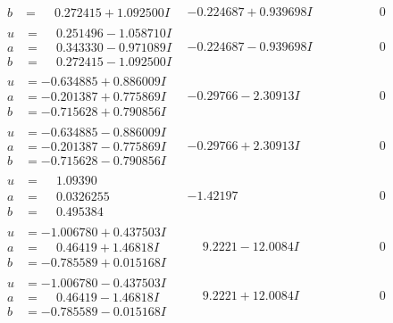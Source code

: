 \documentclass[1p]{elsarticle_modified}
\theoremstyle{definition}
\begin{document}
$$\begin{array}{c|c|c}
\begin{aligned}
b &= \phantom{-}0.272415 + 1.092500 I\end{aligned}
 & -0.224687 + 0.939698 I & \phantom{-0.000000 } 0 \\ \hline\begin{aligned}
u &= \phantom{-}0.251496 - 1.058710 I \\
a &= \phantom{-}0.343330 - 0.971089 I \\
b &= \phantom{-}0.272415 - 1.092500 I\end{aligned}
 & -0.224687 - 0.939698 I & \phantom{-0.000000 } 0 \\ \hline\begin{aligned}
u &= -0.634885 + 0.886009 I \\
a &= -0.201387 + 0.775869 I \\
b &= -0.715628 + 0.790856 I\end{aligned}
 & -0.29766 - 2.30913 I & \phantom{-0.000000 } 0 \\ \hline\begin{aligned}
u &= -0.634885 - 0.886009 I \\
a &= -0.201387 - 0.775869 I \\
b &= -0.715628 - 0.790856 I\end{aligned}
 & -0.29766 + 2.30913 I & \phantom{-0.000000 } 0 \\ \hline\begin{aligned}
u &= \phantom{-}1.09390\phantom{ +0.000000I} \\
a &= \phantom{-}0.0326255\phantom{ +0.000000I} \\
b &= \phantom{-}0.495384\phantom{ +0.000000I}\end{aligned}
 & -1.42197\phantom{ +0.000000I} & \phantom{-0.000000 } 0 \\ \hline\begin{aligned}
u &= -1.006780 + 0.437503 I \\
a &= \phantom{-}0.46419 + 1.46818 I \\
b &= -0.785589 + 0.015168 I\end{aligned}
 & \phantom{-}9.2221 - 12.0084 I & \phantom{-0.000000 } 0 \\ \hline\begin{aligned}
u &= -1.006780 - 0.437503 I \\
a &= \phantom{-}0.46419 - 1.46818 I \\
b &= -0.785589 - 0.015168 I\end{aligned}
 & \phantom{-}9.2221 + 12.0084 I & \phantom{-0.000000 } 0 \\ \hline\begin{aligned}

\end{aligned}
\end{array}$$
\end{document}
